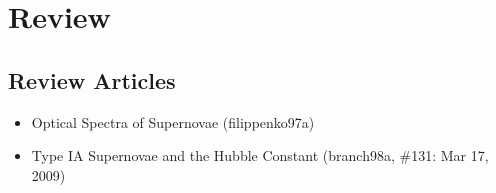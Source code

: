 \chapter{Review}

\section{Review Articles}

\begin{itemize}
\item Optical Spectra of Supernovae (filippenko97a) \citet{filippenko97a}
\item Type IA Supernovae and the Hubble Constant (branch98a, \#131: Mar 17, 2009)
\citet{branch98a}
\end{itemize}


